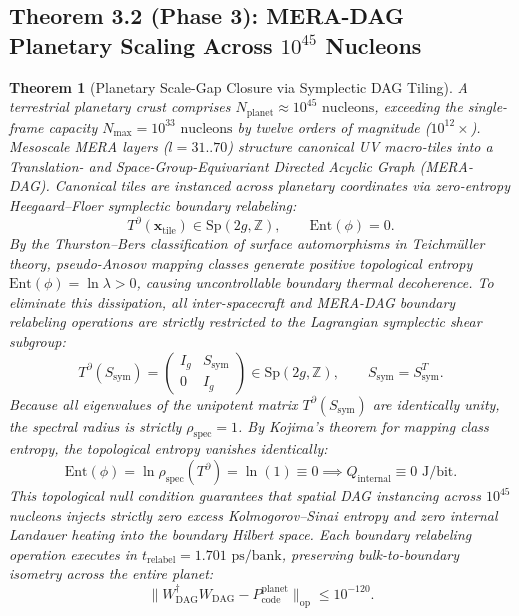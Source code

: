 \documentclass[11pt,onecolumn]{article}
\newtheorem{theorem}{Theorem}
\begin{document}
\subsection[Theorem 3.2 (Phase 3): MERA-DAG Planetary Scaling Across 10 to the 45 Nucleons]{\texorpdfstring{Theorem 3.2 (Phase 3): MERA-DAG Planetary Scaling Across $10^{45}$ Nucleons}{Theorem 3.2 (Phase 3): MERA-DAG Planetary Scaling Across 10e45 Nucleons}}
\begin{theorem}[Planetary Scale-Gap Closure via Symplectic DAG Tiling]
A terrestrial planetary crust comprises $N_{\text{planet}} \approx 10^{45}\text{ nucleons}$, exceeding the single-frame capacity $N_{\max} = 10^{33}\text{ nucleons}$ by twelve orders of magnitude ($10^{12}\times$). Mesoscale MERA layers ($l = 31..70$) structure canonical UV macro-tiles into a Translation- and Space-Group-Equivariant Directed Acyclic Graph (MERA-DAG). Canonical tiles are instanced across planetary coordinates via zero-entropy Heegaard--Floer symplectic boundary relabeling:
\begin{equation}
T^\partial(\mathbf{x}_{\text{tile}}) \in \text{Sp}(2g, \mathbb{Z}), \qquad \text{Ent}(\phi) = 0.
\label{eq:mera_dag_relabeling}
\end{equation}
By the Thurston--Bers classification of surface automorphisms in Teichm\"uller theory, pseudo-Anosov mapping classes generate positive topological entropy $\text{Ent}(\phi) = \ln \lambda > 0$, causing uncontrollable boundary thermal decoherence. To eliminate this dissipation, all inter-spacecraft and MERA-DAG boundary relabeling operations are strictly restricted to the Lagrangian symplectic shear subgroup:
\begin{equation}
T^\partial(S_{\text{sym}}) = \begin{pmatrix} I_g & S_{\text{sym}} \\ 0 & I_g \end{pmatrix} \in \text{Sp}(2g, \mathbb{Z}), \qquad S_{\text{sym}} = S_{\text{sym}}^T.
\label{eq:lagrangian_shear_subgroup}
\end{equation}
Because all eigenvalues of the unipotent matrix $T^\partial(S_{\text{sym}})$ are identically unity, the spectral radius is strictly $\rho_{\text{spec}} = 1$. By Kojima's theorem for mapping class entropy, the topological entropy vanishes identically:
\begin{equation}
\text{Ent}(\phi) = \ln \rho_{\text{spec}}(T^\partial) = \ln(1) \equiv 0 \implies Q_{\text{internal}} \equiv 0\text{ J/bit}.
\label{eq:zero_kojima_entropy}
\end{equation}
This topological null condition guarantees that spatial DAG instancing across $10^{45}$ nucleons injects strictly zero excess Kolmogorov--Sinai entropy and zero internal Landauer heating into the boundary Hilbert space.
Each boundary relabeling operation executes in $t_{\text{relabel}} = 1.701\text{ ps/bank}$, preserving bulk-to-boundary isometry across the entire planet:
\begin{equation}
\|W_{\text{DAG}}^\dagger W_{\text{DAG}} - P_{\text{code}}^{\text{planet}}\|_{\text{op}} \le 10^{-120}.
\label{eq:mera_dag_isometry}
\end{equation}
\end{theorem}
\end{document}
